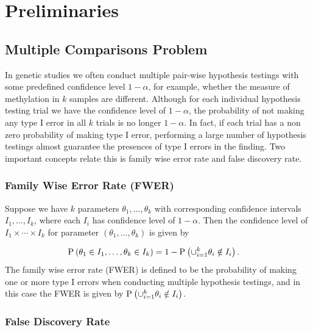 \documentclass{report}
\begin{document}
\chapter{Preliminaries} \label{chapter 2}

\section{Multiple Comparisons Problem}

\par
In genetic studies we often conduct  multiple pair-wise hypothesis testings with some predefined
confidence level $1 - \alpha$, for example, whether the measure of methylation
in  $k$ samples are different.
 Although for each individual hypothesis testing trial 
we have the confidence level of $1 - \alpha$, the probability of not making any type I error in
all $k$ trials is no longer $1 - \alpha$. In fact, if each trial has a non zero probability of making
type I error, performing a large number of hypothesis testings almost guarantee the presences of
type I errors in the finding. Two important concepts relate this is family wise error rate and false
discovery rate.

\subsection{Family Wise Error Rate (FWER)} \label{section : fwer}

\par 
Suppose we have $k$ parameters $\theta_1,\ldots,\theta_k$ with corresponding
confidence intervals $I_1, \ldots, I_k$, where each $I_i$ has confidence level of $1 - \alpha$.
Then the confidence level of $I_1 \times \cdots \times I_k$ for parameter $(\theta_1, \ldots, \theta_k)$ is given by

\begin{align*}
    \P{\theta_1 \in I_1,\ldots,\theta_k \in I_k} &= 1- \P{ \cup_{i=1}^k \theta_i \notin I_i}.
\end{align*}
The family wise error rate (FWER) is defined to be the probability of making one or more type I errors
when conducting multiple hypothesis testings, and in this case the FWER is given by $\P{ \cup_{i=1}^k \theta_i \notin I_i}$.

\subsection{False Discovery Rate}
\end{document}
